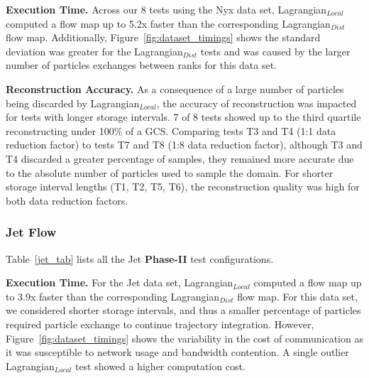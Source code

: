 \textbf{Execution Time.} Across our 8 tests using the Nyx data set, Lagrangian$_{Local}$ computed a flow map up to 5.2x faster than the corresponding Lagrangian$_{Dist}$ flow map.
%
Additionally, Figure~\ref{fig:dataset_timings} shows the standard deviation was greater for the Lagrangian$_{Dist}$ tests and was caused by the larger number of particles exchanges between ranks for this data set.
%

%


\textbf{Reconstruction Accuracy.} As a consequence of a large number of particles being discarded by Lagrangian$_{Local}$, the accuracy of reconstruction was impacted for tests with longer storage intervals.
%
7 of 8 tests showed up to the third quartile reconstructing under 100\% of a GCS. 
%
Comparing tests T3 and T4 (1:1 data reduction factor) to tests T7 and T8 (1:8 data reduction factor), although T3 and T4 discarded a greater percentage of samples, they remained more accurate due to the absolute number of particles used to sample the domain.
%
For shorter storage interval lengths (T1, T2, T5, T6), the reconstruction quality was high for both data reduction factors.
%
%


\vspace{-2mm}
\subsubsection{Jet Flow}
\label{sec:jet}
Table~\ref{jet_tab} lists all the Jet \textbf{Phase-II} test configurations.
%


\textbf{Execution Time.} For the Jet data set, Lagrangian$_{Local}$ computed a flow map up to 3.9x faster than the corresponding Lagrangian$_{Dist}$ flow map.
%
For this data set, we considered shorter storage intervals, and thus a smaller percentage of particles required particle exchange to continue trajectory integration.
%
However, Figure~\ref{fig:dataset_timings} shows the variability in the cost of communication as it was susceptible to network usage and bandwidth contention.
%
A single outlier Lagrangian$_{Local}$ test showed a higher computation cost. 

